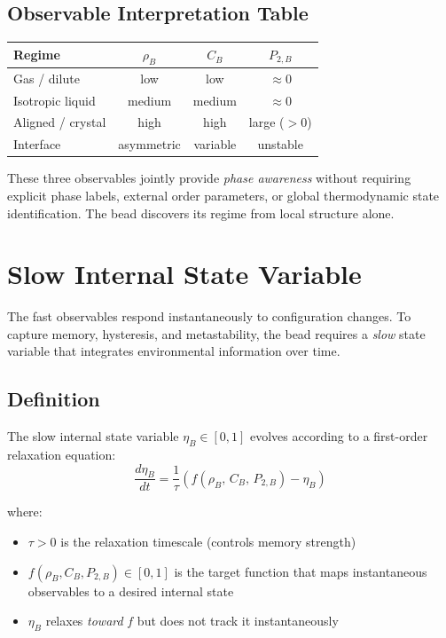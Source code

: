 \documentclass[11pt]{article}
\begin{document}
\subsection{Observable Interpretation Table}

\begin{center}
\begin{tabular}{lccc}
    \textbf{Regime} & $\rho_B$ & $C_B$ & $P_{2,B}$ \\
    \hline
    Gas / dilute       & low       & low       & $\approx 0$ \\
    Isotropic liquid   & medium    & medium    & $\approx 0$ \\
    Aligned / crystal  & high      & high      & large ($>0$) \\
    Interface          & asymmetric & variable & unstable \\
\end{tabular}
\end{center}

These three observables jointly provide \emph{phase awareness} without
requiring explicit phase labels, external order parameters, or global
thermodynamic state identification.  The bead discovers its regime from
local structure alone.

\section{Slow Internal State Variable}

The fast observables respond instantaneously to configuration changes.
To capture memory, hysteresis, and metastability, the bead requires a
\emph{slow} state variable that integrates environmental information over
time.

\subsection{Definition}

The slow internal state variable $\eta_B \in [0, 1]$ evolves according to
a first-order relaxation equation:
\begin{equation}
\boxed{
    \frac{d\eta_B}{dt}
    = \frac{1}{\tau}\left(
        f(\rho_B,\, C_B,\, P_{2,B}) - \eta_B
    \right)
}
\end{equation}

where:
\begin{itemize}
    \item $\tau > 0$ is the relaxation timescale (controls memory strength)
    \item $f(\rho_B, C_B, P_{2,B}) \in [0, 1]$ is the target function
          that maps instantaneous observables to a desired internal state
    \item $\eta_B$ relaxes \emph{toward} $f$ but does not track it
          instantaneously
\end{itemize}
\end{document}
